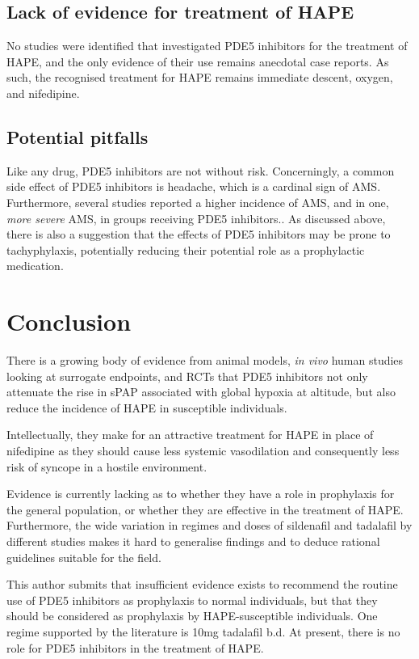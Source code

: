 \documentclass[12pt,a4paper]{article}
\begin{document}
\subsection*{Lack of evidence for treatment of HAPE}

No studies were identified that investigated PDE5 inhibitors for the treatment of HAPE, and the only evidence of their use remains anecdotal case reports. As such, the recognised treatment for HAPE remains immediate descent, oxygen, and nifedipine.

\subsection*{Potential pitfalls}

Like any drug, PDE5 inhibitors are not without risk. Concerningly, a common side effect of PDE5 inhibitors is headache, which is a cardinal sign of AMS. Furthermore, several studies reported a higher incidence of AMS, and in one, \emph{more severe} AMS, in groups receiving PDE5 inhibitors.\cite{Maggiorini:2006kz,Bates:2011du,Leshem:2012jq}. As discussed above, there is also a suggestion that the effects of PDE5 inhibitors may be prone to tachyphylaxis, potentially reducing their potential role as a prophylactic medication.\cite{Bates:2011du}

\section*{Conclusion}

There is a growing body of evidence from animal models, \emph{in vivo} human studies looking at surrogate endpoints, and RCTs that PDE5 inhibitors not only attenuate the rise in sPAP associated with global hypoxia at altitude, but also reduce the incidence of HAPE in susceptible individuals.

Intellectually, they make for an attractive treatment for HAPE in place of nifedipine as they should cause less systemic vasodilation and consequently less risk of syncope in a hostile environment.\cite{JointFormularyCommittee:2013tz}

Evidence is currently lacking as to whether they have a role in prophylaxis for the general population, or whether they are effective in the treatment of HAPE. Furthermore, the wide variation in regimes and doses of sildenafil and tadalafil by different studies makes it hard to generalise findings and to deduce rational guidelines suitable for the field.

This author submits that insufficient evidence exists to recommend the routine use of PDE5 inhibitors as prophylaxis to normal individuals, but that they should be considered as prophylaxis by HAPE-susceptible individuals. One regime supported by the literature is 10mg tadalafil b.d. At present, there is no role for PDE5 inhibitors in the treatment of HAPE.



\end{document}
